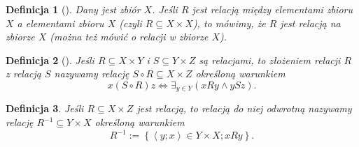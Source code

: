 \documentclass[12pt,a4paper]{report}
\newtheorem{definition}{Definicja}
\newcommand{\parauporzadkowana}[2]{\left\langle {#1}; {#2} \right\rangle}
\newcommand{\zbior}[1]{\left\lbrace {#1} \right\rbrace }
\begin{document}
\begin{definition}[\citep{kraszewski2007wstkep}]
Dany jest zbiór $X$. Jeśli $R$ jest relacją między elementami zbioru $X$ a elementami zbioru $X$ (czyli $R\subseteq X \times X$), to mówimy, że $R$ jest relacją na zbiorze $X$ (można też mówić o relacji w zbiorze $X$).
\end{definition}

\begin{definition}[\citep{kraszewski2007wstkep}]
Jeśli $R\subseteq X\times Y$ i $S\subseteq Y \times Z$ są relacjami, to złożeniem relacji $R$ z relacją $S$ nazywamy relację $S\circ R \subseteq X \times Z$ określoną warunkiem
\begin{equation*}
x(S\circ R)z \iff \exists_{y \in Y} (xRy \land ySz).
\end{equation*}
\end{definition}
\begin{definition}
Jeśli $R \subseteq X \times Z$ jest relacją, to relacją do niej odwrotną nazywamy relację $R^{-1} \subseteq Y \times X$ określoną warunkiem 
\begin{equation*}
R^{-1} := \zbior{\parauporzadkowana{y}{x} \in Y \times X; xRy}.
\end{equation*}
\end{definition}
\end{document}
